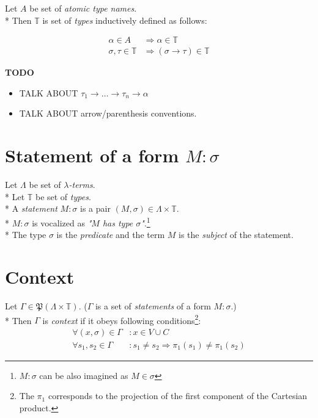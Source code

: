 \documentclass[12pt,a4paper]{report}
\newcommand{\lterms}{$\lambda$-terms\xspace}
\begin{document}
	Let $A$ be set of {\it atomic type names}. \\*
	Then $\mathbb{T}$ is set of {\it types} inductively defined as follows:
	
	\begin{align*}
	\alpha      \in A          &\Rightarrow     \alpha   \in \mathbb{T} \\
	\sigma,\tau \in \mathbb{T} &\Rightarrow ( \sigma \rightarrow  \tau ) \in \mathbb{T} 
	\end{align*} 

\textbf{TODO} 
\begin{itemize}
	\item TALK ABOUT $\tau_1 \rightarrow \dots \rightarrow \tau_n \rightarrow \alpha$ 
	\item TALK ABOUT arrow/parenthesis conventions. 
\end{itemize}
	
	
\section{Statement of a form $M : \sigma$}

	Let $\Lambda$ be set of {\it \lterms}. \\*
	Let $\mathbb{T}$ be set of {\it types}.       \\*
	A {\it statement} $M : \sigma$ is a pair $(M,\sigma) \in \Lambda \times \mathbb{T}$. \\*
	$M : \sigma$ is vocalized as {\it "$M$ has type $\sigma$"}.\footnote{ 
	$M : \sigma$ can be also imagined as $M \in \sigma$ } \\*
	The type $\sigma$ is the {\it predicate} and the term $M$ is the
	{\it subject} of the statement.  
	
\section{Context}

	Let $\Gamma \in \mathfrak P \left({\Lambda \times  \mathbb{T}}\right)$. 
	($\Gamma$ is a set of {\it statements} of a form $M : \sigma$.)	\\*
	Then $\Gamma$ is {\it context} if it obeys following 
	conditions\footnote{
	The $\pi_1$ corresponds to the projection of the first component of the Cartesian product.
	}:
	\begin{align*}
		 \forall (x,\sigma) \in \Gamma &: x \in V \cup C \\
		 \forall s_1,s_2 \in \Gamma &: s_1 \neq s_2 \Rightarrow \pi_1(s_1) \neq \pi_1(s_2)
    \end{align*}
    
\end{document}
